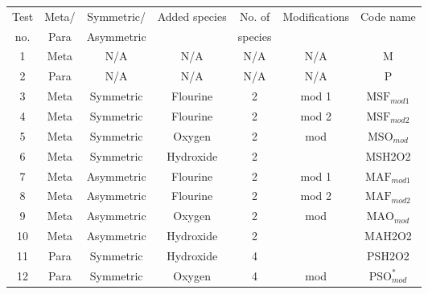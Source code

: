\begin{table}[ht]
	\centering
	\begin{tabular}{ccccccc}
		\toprule
		Test & Meta/ & Symmetric/ & \multirow{2}{*}{Added species} & No. of  & \multirow{2}{*}{Modifications} & \multirow{2}{*}{Code name} \\
		no.  & Para  & Asymmetric &                                & species &                                &                            \\\midrule
		1    & Meta  & N/A        & N/A                            & N/A     & N/A                            & M                          \\
		2    & Para  & N/A        & N/A                            & N/A     & N/A                            & P                          \\
		3    & Meta  & Symmetric  & Flourine                       & 2       & mod 1                          & \(\text{MSF}_{mod1}\)      \\
		4    & Meta  & Symmetric  & Flourine                       & 2       & mod 2                          & \(\text{MSF}_{mod2}\)      \\
		5    & Meta  & Symmetric  & Oxygen                         & 2       & mod                            & \(\text{MSO}_{mod}\)       \\
		6    & Meta  & Symmetric  & Hydroxide                      & 2       &                                & MSH2O2                     \\
		7    & Meta  & Asymmetric & Flourine                       & 2       & mod 1                          & \(\text{MAF}_{mod1}\)      \\
		8    & Meta  & Asymmetric & Flourine                       & 2       & mod 2                          & \(\text{MAF}_{mod2}\)      \\
		9    & Meta  & Asymmetric & Oxygen                         & 2       & mod                            & \(\text{MAO}_{mod}\)       \\
		10   & Meta  & Asymmetric & Hydroxide                      & 2       &                                & MAH2O2                     \\
		11   & Para  & Symmetric  & Hydroxide                      & 4       &                                & PSH2O2                     \\
		12   & Para  & Symmetric  & Oxygen                         & 4       & mod                            & \(\text{PSO}^{*}_{mod}\)   \\

\end{tabular}
\end{table}
